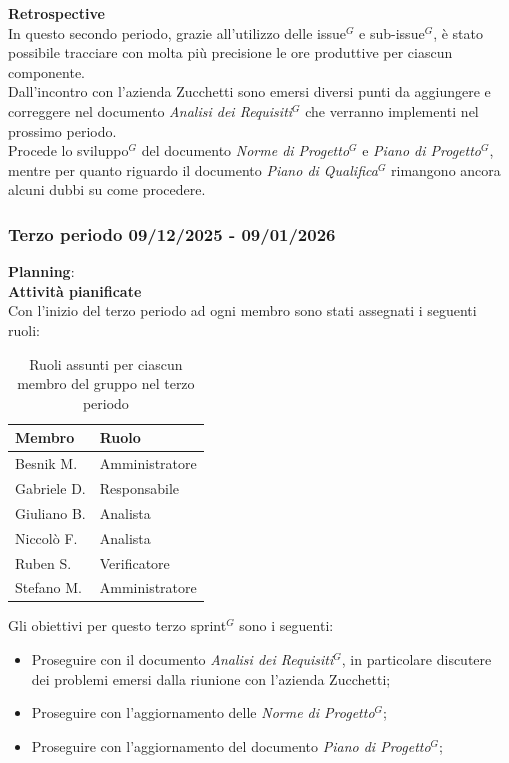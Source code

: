 \documentclass[a4paper,10pt]{article}
\begin{document}
\textbf{Retrospective} \\
In questo secondo periodo, grazie all'utilizzo delle issue$^G$ e sub-issue$^G$, è stato possibile tracciare con molta più precisione le ore produttive per ciascun componente. \\ Dall'incontro con l'azienda Zucchetti sono emersi diversi punti da aggiungere e correggere nel documento \textit{Analisi dei Requisiti$^G$} che verranno implementi nel prossimo periodo. \\ Procede lo sviluppo$^G$ del documento \textit{Norme di Progetto$^G$} e \textit{Piano di Progetto$^G$}, mentre per quanto riguardo il documento \textit{Piano di Qualifica$^G$} rimangono ancora alcuni dubbi su come procedere.

\subsubsection{Terzo periodo 09/12/2025 - 09/01/2026}
\textbf{Planning}: \\
\textbf{Attività pianificate} \\ Con l'inizio del terzo periodo ad ogni membro sono stati assegnati i seguenti ruoli: 
\begin{table}[H]
\centering
\begin{tabular}{|l|l|}
\hline
\textbf{Membro} & \textbf{Ruolo} \\
\hline
Besnik M.  & Amministratore \\
\hline
Gabriele D.  & Responsabile \\
\hline
Giuliano B. & Analista \\
\hline
Niccolò F. & Analista \\
\hline
Ruben S. & Verificatore \\
\hline
Stefano M.  & Amministratore \\
\hline
\end{tabular}
\caption{Ruoli assunti per ciascun membro del gruppo nel terzo periodo}
\end{table}

Gli obiettivi per questo terzo sprint$^G$ sono i seguenti:
\begin{itemize}
  \item Proseguire con il documento \textit{Analisi dei Requisiti$^G$}, in particolare discutere dei problemi emersi dalla riunione con l'azienda Zucchetti;
  \item Proseguire con l'aggiornamento delle \textit{Norme di Progetto$^G$};
  \item Proseguire con l'aggiornamento del documento \textit{Piano di Progetto$^G$};
\end{itemize}
\end{document}
